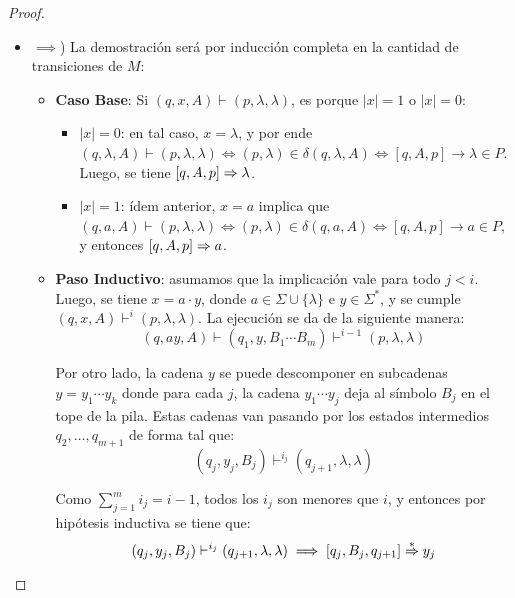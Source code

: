 \begin{proof}
    \begin{itemize}
        \item $\implies$) La demostración será por inducción completa en la cantidad de transiciones de $M$:
        \begin{itemize}
            \item \textbf{Caso Base}: Si $(q, x, A) \vdash (p, \lambda, \lambda)$, es porque $|x| = 1$ o $|x| = 0$:
            \begin{itemize}
                \item $|x| = 0$: en tal caso, $x = \lambda$, y por ende $(q, \lambda, A) \vdash (p, \lambda, \lambda) \iff (p, \lambda) \in \delta(q, \lambda, A) \iff [q, A, p] \to \lambda \in P$. Luego, se tiene $[q, A, p] \Rightarrow \lambda$.
                \item $|x| = 1$: ídem anterior, $x = a$ implica que $(q, a, A) \vdash (p, \lambda, \lambda) \iff (p, \lambda) \in \delta(q, a, A) \iff [q, A, p] \to a \in P$, y entonces $[q, A, p] \Rightarrow a$.
            \end{itemize}
            \item \textbf{Paso Inductivo}: asumamos que la implicación vale para todo $j < i$. Luego, se tiene $x = a \cdot y$, donde $a \in \Sigma \cup \{\lambda\}$ e $y \in \Sigma^*$, y se cumple $(q, x, A) \vdash^i (p, \lambda, \lambda)$. La ejecución se da de la siguiente manera:
            $$
                (q, ay, A) \vdash (q_1, y, B_1 \cdots B_m) \vdash^{i - 1} (p, \lambda, \lambda)
            $$

            Por otro lado, la cadena $y$ se puede descomponer en subcadenas $y = y_1 \cdots y_k$ donde para cada $j$, la cadena $y_1 \cdots y_j$ deja al símbolo $B_j$ en el tope de la pila. Estas cadenas van pasando por los estados intermedios $q_2, \dots, q_{m + 1}$ de forma tal que:
            $$
                (q_j, y_j, B_j) \vdash^{i_j} (q_{j + 1}, \lambda, \lambda)
            $$

            Como $\sum_{j = 1}^m i_j = i - 1$, todos los $i_j$ son menores que $i$, y entonces por hipótesis inductiva se tiene que:
            $$
                (q_j, y_j, B_j) \vdash^{i_j} (q_{j + 1}, \lambda, \lambda) \implies [q_j, B_j, q_{j + 1}] \overset{*}{\Rightarrow} y_j
            $$


\end{itemize}
\end{itemize}
\end{proof}
